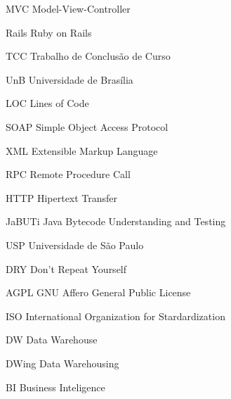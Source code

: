 \begin{siglas}
  
  \item[MVC] Model-View-Controller
  \item[Rails] Ruby on Rails
  \item[TCC] Trabalho de Conclusão de Curso
  \item[UnB] Universidade de Brasília
  \item[LOC] Lines of Code
  \item[SOAP] Simple Object Access Protocol
  \item[XML] Extensible Markup Language
  \item[RPC] Remote Procedure Call
  \item[HTTP] Hipertext Transfer
  \item[JaBUTi] Java Bytecode Understanding and Testing
  \item[USP] Universidade de São Paulo
  \item[DRY] Don't Repeat Yourself
  \item[AGPL] GNU Affero General Public License
  \item[ISO] International Organization for Stardardization
  \item[DW] Data Warehouse
  \item[DWing] Data Warehousing
  \item[BI] Business Inteligence
  
\end{siglas}
